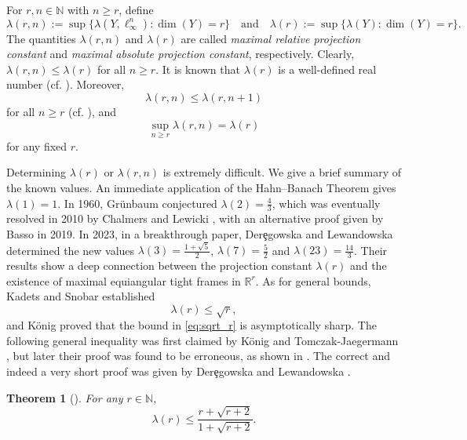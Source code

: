 \documentclass[11pt]{article}
\theoremstyle{plain}
\newtheorem{theorem}{Theorem}[section]
\numberwithin{equation}{section}
\begin{document}
For $r, n\in \mathbb{N}$ with $n\ge r$, define 
\begin{equation}\label{eq:defn}
   \lambda(r, n):= \sup\{\lambda(Y, \ell_\infty^n): \dim(Y) = r\} \quad \text{and}\quad  \lambda(r):= \sup\{\lambda(Y): \dim(Y) = r\}. 
\end{equation}
The quantities $\lambda(r,n)$ and $\lambda(r)$ are called \emph{maximal relative projection constant} and \emph{maximal absolute projection constant}, respectively. Clearly, $\lambda(r, n)\le \lambda(r)$ for all $n \ge r$. It is known that $\lambda(r)$ is a well-defined real number (cf. \cite{Basso_2019}). Moreover,
\begin{equation}
   \lambda(r,n)\le \lambda(r,n+1) 
\end{equation}
for all $n\ge r$ (cf. \cite{Chalmers_Lewicki_2010}), and
\begin{equation}\label{eq:sup_r_d_equal_absolute}
  \sup_{n\ge r} \lambda(r,n) = \lambda(r)  
\end{equation}
for any fixed $r$. 

Determining $\lambda(r)$ or $\lambda(r,n)$ is extremely difficult. We give a brief summary of the known values. An immediate application of the Hahn--Banach Theorem gives $\lambda(1) = 1$. In 1960, Gr\"{u}nbaum conjectured $\lambda(2)=\frac{4}{3}$, which was eventually resolved in 2010 by Chalmers and Lewicki \cite{Chalmers_Lewicki_2010}, with an alternative proof given by Basso \cite{Basso_2019} in 2019. In 2023, in a breakthrough paper, Der\c{e}gowska and Lewandowska \cite{Deregowska_Lewandowska_2023} determined the new values $\lambda(3) = \frac{1+\sqrt{5}}{2}$, $\lambda(7) = \frac{5}{2}$ and $\lambda(23) = \frac{14}{3}$. Their results show a deep connection between the projection constant $\lambda(r)$ and the existence of maximal equiangular tight frames in $\mathbb{R}^r$. As for general bounds, Kadets and Snobar \cite{Kadets_Snobar_1971} established 
\begin{equation}\label{eq:sqrt_r}
  \lambda(r)\le \sqrt{r}, 
\end{equation}
and K\"{o}nig \cite{Konig_1985} proved that the bound in \eqref{eq:sqrt_r} is asymptotically sharp. The following general inequality was first claimed by K\"{o}nig and Tomczak-Jaegermann \cite{Konig_Jaegermann_1994}, but later their proof was found to be erroneous, as shown in \cite{Chalmers_Lewicki_2009}. The correct and indeed a very short proof was given by Der\c{e}gowska and Lewandowska \cite{Deregowska_Lewandowska_2023}.  

\begin{theorem}[\cite{Deregowska_Lewandowska_2023}]\label{thm:D_L_bound} For any $r\in \mathbb{N}$, 
   \begin{equation}
       \lambda(r)\le \frac{r + \sqrt{r+2}}{1+\sqrt{r+2}}.
   \end{equation}
\end{theorem}
\end{document}
